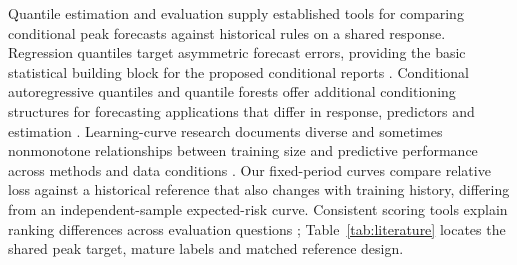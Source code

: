 \documentclass[11pt,a4paper]{article}
\begin{document}
Quantile estimation and evaluation supply established tools for comparing conditional peak forecasts against historical rules on a shared response. Regression quantiles target asymmetric forecast errors, providing the basic statistical building block for the proposed conditional reports \citep{koenker1978}. Conditional autoregressive quantiles and quantile forests offer additional conditioning structures for forecasting applications that differ in response, predictors and estimation \citep{engle2004,meinshausen2006}. Learning-curve research documents diverse and sometimes nonmonotone relationships between training size and predictive performance across methods and data conditions \citep{viering2023}. Our fixed-period curves compare relative loss against a historical reference that also changes with training history, differing from an independent-sample expected-risk curve. Consistent scoring tools explain ranking differences across evaluation questions \citep{gneiting2011,ehm2016}; Table~\ref{tab:literature} locates the shared peak target, mature labels and matched reference design.
\end{document}
